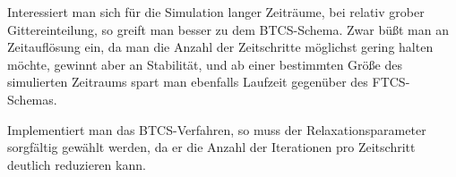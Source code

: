 Interessiert man sich für die Simulation langer Zeiträume, bei relativ grober Gittereinteilung, so greift man besser zu dem BTCS-Schema.
Zwar büßt man an Zeitauflösung ein, da man die Anzahl der Zeitschritte möglichst gering halten möchte, gewinnt aber an Stabilität, und ab einer bestimmten Größe des simulierten Zeitraums spart man ebenfalls Laufzeit gegenüber des FTCS-Schemas.

Implementiert man das BTCS-Verfahren, so muss der Relaxationsparameter sorgfältig gewählt werden, da er die Anzahl der Iterationen pro Zeitschritt deutlich reduzieren kann.
\newpage
{}


